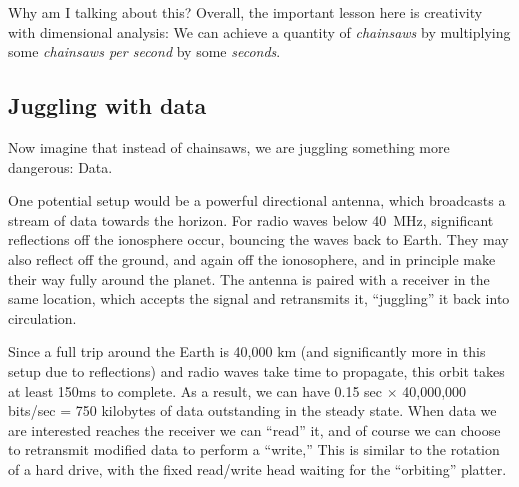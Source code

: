 \documentclass[twocolumn]{article}
\newcommand\sfrac[2]{\!{}\,^{#1}\!/{}\!_{#2}}
\begin{document}
Why am I talking about this? Overall, the important lesson here is
creativity with dimensional analysis: We can achieve a quantity of
{\it chainsaws} by multiplying some {\it chainsaws per second} by some
{\it seconds}.


% 

% 
% 
% 
% 
\subsection{Juggling with data}

Now imagine that instead of chainsaws, we are juggling something more
dangerous: Data.

One potential setup would be a powerful directional antenna, which
broadcasts a stream of data towards the horizon. For radio waves below
40~MHz, significant reflections off the ionosphere occur, bouncing the
waves back to Earth. They may also reflect off the ground, and again
off the ionosophere, and in principle make their way fully around the
planet. The antenna is paired with a receiver in the same location,
which accepts the signal and retransmits it, ``juggling'' it back into
circulation.

Since a full trip around the Earth is 40,000 km (and significantly
more in this setup due to reflections) and radio waves take time to
propagate, this orbit takes at least 150ms to
complete. As a result, we can have 0.15 sec $\times$ 40,000,000
bits/sec = 750 kilobytes of data outstanding in the steady state. When
data we are interested reaches the receiver we can ``read'' it, and of
course we can choose to retransmit modified data to perform a
``write,'' This is similar to the rotation of a hard drive, with the
fixed read/write head waiting for the ``orbiting'' platter.
\end{document}
